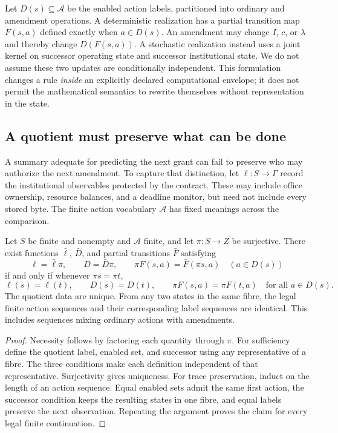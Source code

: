 Let $D(s)\subseteq\mathcal A$ be the enabled action labels, partitioned into ordinary and amendment operations. A deterministic realization has a partial transition map $F(s,a)$ defined exactly when $a\in D(s)$. An amendment may change $I$, $c$, or $\lambda$ and thereby change $D(F(s,a))$. A stochastic realization instead uses a joint kernel on successor operating state and successor institutional state. We do not assume these two updates are conditionally independent. This formulation changes a rule \emph{inside} an explicitly declared computational envelope; it does not permit the mathematical semantics to rewrite themselves without representation in the state.

\subsection{A quotient must preserve what can be done}
A summary adequate for predicting the next grant can fail to preserve who may authorize the next amendment. To capture that distinction, let $\ell:S\to\Gamma$ record the institutional observables protected by the contract. These may include office ownership, resource balances, and a deadline monitor, but need not include every stored byte. The finite action vocabulary $\mathcal A$ has fixed meanings across the comparison.

\begin{MStheorem}\label{MS:thm:govquot}
Let $S$ be finite and nonempty and $\mathcal A$ finite, and let $\pi:S\to Z$ be surjective. There exist functions $\bar\ell$, $\bar D$, and partial transitions $\bar F$ satisfying
\[
\ell=\bar\ell\pi,\qquad D=\bar D\pi,\qquad
\pi F(s,a)=\bar F(\pi s,a)\quad(a\in D(s))
\]
if and only if whenever $\pi s=\pi t$,
\[
\ell(s)=\ell(t),\qquad D(s)=D(t),\qquad
\pi F(s,a)=\pi F(t,a)\quad\text{for all }a\in D(s).
\]
The quotient data are unique. From any two states in the same fibre, the legal finite action sequences and their corresponding label sequences are identical. This includes sequences mixing ordinary actions with amendments.
\end{MStheorem}
\begin{proof}
Necessity follows by factoring each quantity through $\pi$. For sufficiency define the quotient label, enabled set, and successor using any representative of a fibre. The three conditions make each definition independent of that representative. Surjectivity gives uniqueness. For trace preservation, induct on the length of an action sequence. Equal enabled sets admit the same first action, the successor condition keeps the resulting states in one fibre, and equal labels preserve the next observation. Repeating the argument proves the claim for every legal finite continuation.
\end{proof}

